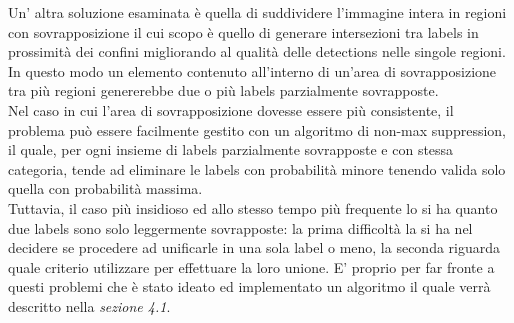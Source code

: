 Un' altra soluzione esaminata è quella di suddividere l'immagine intera in regioni con sovrapposizione il cui scopo è quello di generare intersezioni tra labels in prossimità dei confini migliorando al qualità delle detections nelle singole regioni. In questo modo un elemento contenuto all'interno di un'area di sovrapposizione tra più regioni genererebbe due o più labels parzialmente sovrapposte.\\
Nel caso in cui l'area di sovrapposizione dovesse essere più consistente, il problema può essere facilmente gestito con un algoritmo di non-max suppression, il quale, per ogni insieme di labels parzialmente sovrapposte e con stessa categoria, tende ad eliminare le labels con probabilità minore tenendo valida solo quella con probabilità massima.\\
Tuttavia, il caso più insidioso ed allo stesso tempo più frequente lo si ha quanto due labels sono solo leggermente sovrapposte: la prima difficoltà la si ha nel decidere se procedere ad unificarle in una sola label o meno, la seconda riguarda quale criterio utilizzare per effettuare la loro unione. E' proprio per far fronte a questi problemi che è stato ideato ed implementato un algoritmo il quale verrà descritto nella \textit{sezione 4.1}.
